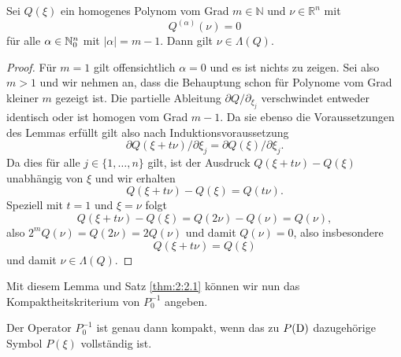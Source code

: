 \begin{lem}\label{Lema:homogene Polynome} 
Sei $Q(\xi)$ ein homogenes Polynom vom Grad $m \in \mathbb{N}$ und  $\nu \in \mathbb{R}^n$ mit
\begin{equation}
Q^{(\alpha)}(\nu)=0
\end{equation}
für alle $\alpha\in\mathbb N_0^n$ mit $|\alpha|=m-1$. Dann gilt $\nu \in \Lambda(Q)$.
\end{lem}
\begin{proof}
Für $m=1$ gilt offensichtlich $\alpha = 0$ und es ist nichts zu zeigen. Sei also $m>1$ und wir nehmen an, dass die Behauptung schon für Polynome vom Grad kleiner $m$ gezeigt ist. Die partielle Ableitung $\partial Q/\partial_{\xi_j}$ verschwindet entweder identisch oder ist homogen vom Grad $m-1$. Da sie ebenso die Voraussetzungen des Lemmas erfüllt gilt also nach Induktionsvoraussetzung
\begin{equation}
\partial Q(\xi + t \nu)/ \partial \xi_j = \partial Q(\xi)/\partial \xi_j.
\end{equation}
Da dies für alle $j\in\{1,\ldots,n\}$ gilt, ist der Ausdruck $Q(\xi + t \nu) - Q(\xi)$ unabhängig von $\xi$ und wir erhalten
\begin{equation}
Q(\xi + t \nu) - Q(\xi) = Q(t \nu).
\end{equation}
Speziell mit $t=1$ und $\xi=\nu$ folgt
\begin{equation}
Q(\xi + t\nu) - Q(\xi) = Q(2 \nu) - Q(\nu)= Q(\nu), 
\end{equation}
also $2^mQ(\nu)=Q(2\nu) = 2 Q(\nu)$ und damit $Q(\nu)=0$, also insbesondere
\begin{equation}
Q(\xi + t\nu) = Q(\xi)
\end{equation}
und damit $\nu \in \Lambda(Q)$.
\end{proof}
Mit diesem Lemma und Satz \ref{thm:2:2.1} können wir nun das Kompaktheitskriterium von $P_0^{-1}$ angeben.
\begin{thm}
Der Operator $P_0^{-1}$ ist genau dann kompakt, wenn das zu $P(\mathrm D)$ dazugehörige Symbol $P(\xi)$ vollständig ist.
\end{thm}
